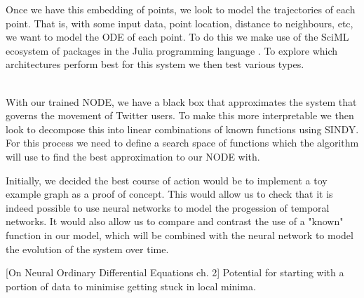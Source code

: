 \documentclass{article}
\begin{document}
    Once we have this embedding of points, we look to model the trajectories of each point. That is, with some input data, point location, distance to neighbours, etc, we want to model the ODE of each point. To do this we make use of the SciML ecosystem of packages in the Julia programming language \cite{SciML_C_Rak}. To explore which architectures perform best for this system we then test various types. ~~~~~~~~~~~~~~~~~~~~~~~~
    
    With our trained NODE, we have a black box that approximates the system that governs the movement of Twitter users. To make this more interpretable we then look to decompose this into linear combinations of known functions using SINDY. For this process we need to define a search space of functions which the algorithm will use to find the best approximation to our NODE with. 
    
    
    
    
    
    
    
    
    
    Initially, we decided the best course of action would be to implement a toy example graph as a proof of concept.
    This would allow us to check that it is indeed possible to use neural networks to model the progession of temporal networks.
    It would also allow us to compare and contrast the use of a "known" function in our model, which will be combined with the 
    neural network to model the evolution of the system over time.
    
    [On Neural Ordinary Differential Equations ch. 2] Potential for starting with a portion of data to minimise getting stuck in 
    local minima.
\end{document}
